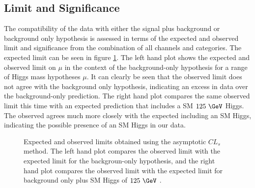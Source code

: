 \subsection{Limit and Significance}
\label{sec:significance}

The compatibility of the data with either the signal plus background or
background only hypothesis is assessed in terms of the expected and observed
limit and significance from the combination of all channels and categories. The
expected limit can be seen in figure \ref{fig:results-limit}. The left hand plot
shows the expected and observed limit on $\mu$ in the context of the
background-only hypothesis for a range of Higgs mass hypotheses $\mu$. 
It can clearly be seen that the observed limit does not agree with the background 
only hypothesis, indicating an excess in data over the background-only
prediction. The right hand plot compares the same observed limit this time with
an expected prediction that includes a \ac{SM} $125~\GeV$ Higgs. The observed
agrees much more closely with the expected including an \ac{SM} Higgs,
indicating the possible presence of an \ac{SM} Higgs in our data. 

\begin{figure}[h!]
\caption[Expected and observed limits on $\mu$ obtained using the asymptotic $CL_{s}$
method.]{Expected and observed limits obtained using the asymptotic $CL_{s}$
method. The left hand plot compares the observed limit with the expected limit
for the backgroun-only hypothesis, and the right hand plot compares the observed
limit with the expected limit for background only plus SM Higgs of
$125~\GeV$ \cite{HIG-13-004}. }
\label{fig:results-limit}
\end{figure}


